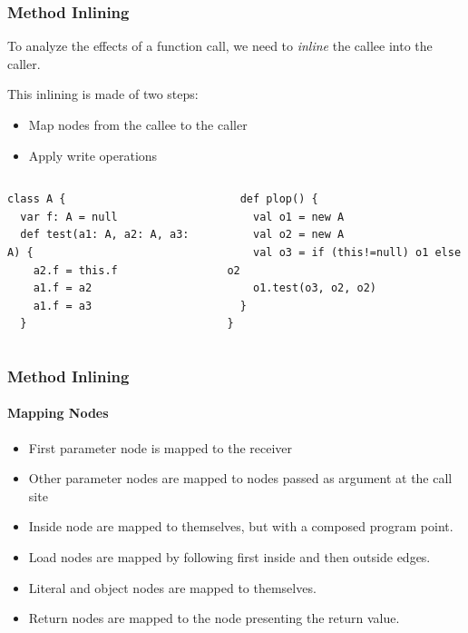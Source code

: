 \documentclass[hyperref={pdfpagelabels=false}]{beamer}
\begin{document}
\begin{frame}[fragile]
    \frametitle{Method Inlining}
    To analyze the effects of a function call, we need to \emph{inline} the
    callee into the caller.

    \vspace{10pt}

    This inlining is made of two steps:
    \begin{itemize}
        \item Map nodes from the callee to the caller
        \item Apply write operations
    \end{itemize}

\begin{columns}
      \begin{column}{0.40\textwidth}
\begin{lstlisting}
class A {
  var f: A = null
  def test(a1: A, a2: A, a3: A) {
    a2.f = this.f
    a1.f = a2
    a1.f = a3
  }

\end{lstlisting}
      \end{column}
      \begin{column}{0.60\textwidth}
\begin{lstlisting}
  def plop() {
    val o1 = new A
    val o2 = new A
    val o3 = if (this!=null) o1 else o2
    o1.test(o3, o2, o2)
  }
}
\end{lstlisting}
      \end{column}
\end{columns}
\end{frame}

\begin{frame}[fragile]
    \frametitle{Method Inlining}
    \framesubtitle{Mapping Nodes}

    \begin{itemize}
        \item First parameter node is mapped to the receiver
        \item Other parameter nodes are mapped to nodes passed as argument at
        the call site
        \item Inside node are mapped to themselves, but with a composed program
        point.
        \item Load nodes are mapped by following first inside and then outside
        edges.
        \item Literal and object nodes are mapped to themselves.
        \item Return nodes are mapped to the node presenting the return value.
    \end{itemize}


\end{frame}
\end{document}
